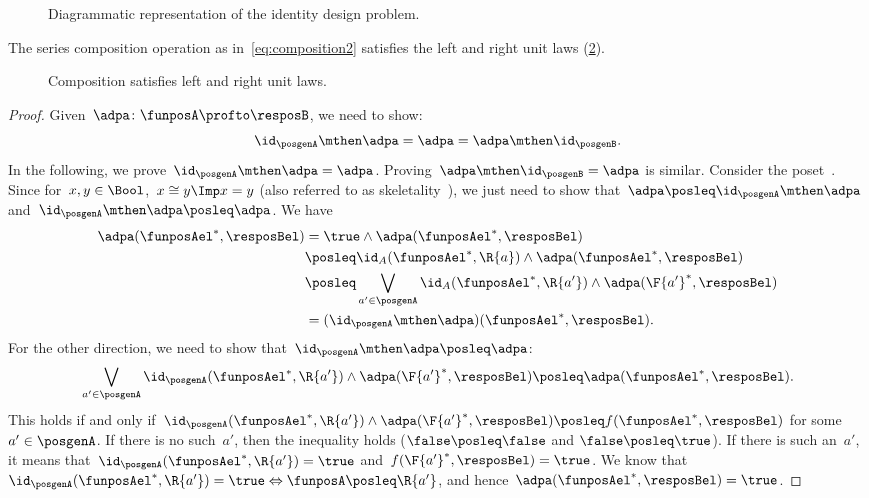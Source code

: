 \begin{figure}[h!]
  \begin{center}
  \end{center}
  \caption{Diagrammatic representation of the identity design problem. \label{fig:identitydp}}
\end{figure}

\begin{lemma}\label{lem:compositionunital}
  The series composition operation as in~\cref{eq:composition2} satisfies the left and right unit laws (\cref{fig:compositionunital}).
\end{lemma}
  \begin{figure}[h!]
    \begin{center}
    \end{center}
    \caption{Composition satisfies left and right unit laws. \label{fig:compositionunital}}
  \end{figure}
\begin{proof}
  Given~$\adpa\colon \funposA\profto \resposB$, we need to show:
  \begin{equation*}
    \id_\posgenA \mthen \adpa= \adpa = \adpa\mthen \id_\posgenB.
  \end{equation*}
  In the following, we prove~$\id_\posgenA \mthen \adpa = \adpa$.
  Proving~$\adpa\mthen \id_\posgenB=\adpa$ is similar.
  Consider the poset~\Bool. Since for~$x,y\in \Bool$,~$x\cong y \Imp x=y$ (also referred to as skeletality~\cite{fong2019}), we just need to show that~$\adpa\posleq \id_\posgenA\mthen \adpa$ and~$\id_\posgenA\mthen \adpa\posleq \adpa$.
  We have
  \begin{equation*}
    \label{eq:dp_unit_1}
    \begin{aligned}
      \adpa(\funposAel^*,\resposBel)&=\true \wedge \adpa(\funposAel^*,\resposBel)\\
      &\posleq \id_A(\funposAel^*,\R{a}) \wedge \adpa(\funposAel^*,\resposBel)\\
      &\posleq \bigvee_{a'\in \posgenA}\id_A(\funposAel^*,\R{a'})\wedge \adpa(\F{a'}^*,\resposBel)\\
      &=(\id_\posgenA\mthen \adpa)(\funposAel^*,\resposBel).
    \end{aligned}
  \end{equation*}
  For the other direction, we need to show that~$\id_\posgenA\mthen \adpa\posleq \adpa$:
  \begin{equation*}
    \label{eq:dp_unit_2}
    \bigvee_{a'\in \posgenA}\id_\posgenA(\funposAel^*,\R{a'})\wedge \adpa(\F{a'}^*,\resposBel) \posleq \adpa(\funposAel^*,\resposBel).
  \end{equation*}
  This holds if and only if~$\id_\posgenA(\funposAel^*,\R{a'})\wedge \adpa(\F{a'}^*,\resposBel) \posleq f(\funposAel^*,\resposBel)$ for some~$a'\in \posgenA$.
  If there is no such~$a'$, then the inequality holds ($\false \posleq \false$ and $\false \posleq \true$).
  If there is such an~$a'$, it means that~$\id_\posgenA(\funposAel^*,\R{a'})=\true$ and~$f(\F{a'}^*,\resposBel)=\true$.
  We know that~$\id_\posgenA(\funposAel^*,\R{a'})=\true \Leftrightarrow \funposA\posleq \R{a'}$, and hence~$\adpa(\funposAel^*,\resposBel)=\true$.
\end{proof}